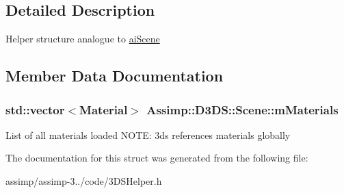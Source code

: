 \subsection{Detailed Description}
Helper structure analogue to \hyperlink{structai_scene}{ai\+Scene} 

\subsection{Member Data Documentation}
\hypertarget{struct_assimp_1_1_d3_d_s_1_1_scene_af108cda35d26cce4e0b5e48f6a20e4c1}{
\subsubsection[{m\+Materials}]{\setlength{\rightskip}{0pt plus 5cm}std\+::vector$<${\bf Material}$>$ Assimp\+::\+D3\+D\+S\+::\+Scene\+::m\+Materials}}\label{struct_assimp_1_1_d3_d_s_1_1_scene_af108cda35d26cce4e0b5e48f6a20e4c1}
List of all materials loaded N\+O\+T\+E\+: 3ds references materials globally 

The documentation for this struct was generated from the following file\+:\begin{DoxyCompactItemize}
\item 
assimp/assimp-\/3../code/3\+D\+S\+Helper.\+h\end{DoxyCompactItemize}
